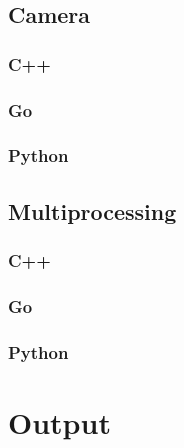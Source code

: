 \subsection{Camera}
\subsubsection{C++}
\subsubsection{Go}
\subsubsection{Python}

\subsection{Multiprocessing}
\subsubsection{C++}
\subsubsection{Go}
\subsubsection{Python}

\section{Output}
